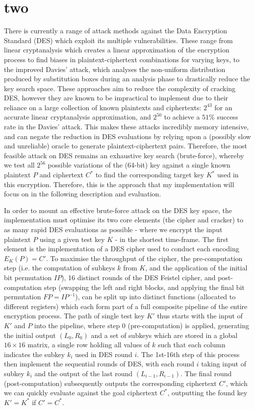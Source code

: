 \documentclass[a4paper, 11pt]{article}
\begin{document}
    \section{two}
    There is currently a range of attack methods against the Data Encryption Standard (DES) which exploit its multiple vulnerabilities. These range from linear cryptanalysis which creates a linear approximation of the encryption process to find biases in plaintext-ciphertext combinations for varying keys, to the improved Davies' attack, which analyses the non-uniform distribution produced by substitution boxes during an analysis phase to drastically reduce the key search space. These approaches aim to reduce the complexity of cracking DES, however they are known to be impractical to implement due to their reliance on a large collection of known plaintexts and ciphertexts: $2^{43}$ for an accurate linear cryptanalysis approximation, and $2^{50}$ to achieve a $51\%$ success rate in the Davies' attack. This makes these attacks incredibly memory intensive, and can negate the reduction in DES evaluations by relying upon a (possibly slow and unreliable) oracle to generate plaintext-ciphertext pairs. Therefore, the most feasible attack on DES remains an exhaustive key search (brute-force), whereby we test all $2^{56}$ possible variations of the (64-bit) key against a single known plaintext $P$ and ciphertext $C^{*}$ to find the corresponding target key $K^{*}$ used in this encryption. Therefore, this is the approach that my implementation will focus on in the following description and evaluation.

In order to mount an effective brute-force attack on the DES key space, the implementation must optimise its two core elements (the cipher and cracker) to as many rapid DES evaluations as possible - where we encrypt the input plaintext $P$ using a given test key $K$ - in the shortest time-frame. The first element is the implementation of a DES cipher used to conduct each encoding $E_{K}(P) = C'$. To maximise the throughput of the cipher, the pre-computation step (i.e. the computation of subkeys $k$ from $K$, and the application of the initial bit permutation $IP$), 16 distinct rounds of the DES Feistel cipher, and post-computation step (swapping the left and right blocks, and applying the final bit permutation $FP=IP^{-1}$), can be split up into distinct functions (allocated to different registers) which each form part of a full composite pipeline of the entire encryption process. The path of single test key $K'$ thus starts with the input of $K'$ and $P$ into the pipeline, where step 0 (pre-computation) is applied, generating the initial output $(L_{0}, R_{0})$ and a set of subkeys which are stored in a global $16 \times 16$ matrix, a single row holding all values of $k$ such that each column indicates the subkey $k_i$ used in DES round $i$. The 1st-16th step of this process then implement the sequential rounds of DES, with each round $i$ taking input of subkey $k_i$ and the output of the last round $(L_{i-1}, R_{i-1})$. The final round (post-computation) subsequently outputs the corresponding ciphertext $C'$, which we can quickly evaluate against the goal ciphertext $C^{*}$, outputting the found key $K' = K^{*}$ if $C' = C^{*}$.
\end{document}
